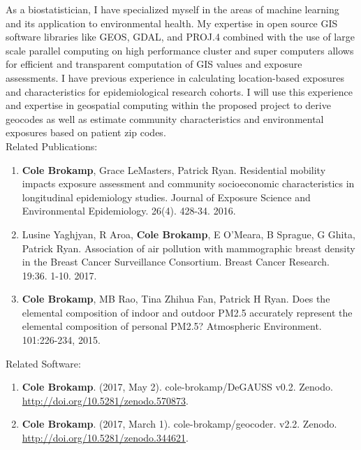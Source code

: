 \documentclass{nihbiosketch}
\begin{document}
\begin{statement}
As a biostatistician, I have specialized myself in the areas of machine learning and its application to environmental health. My expertise in open source GIS software libraries like GEOS, GDAL, and PROJ.4 combined with the use of large scale parallel computing on high performance cluster and super computers allows for efficient and transparent computation of GIS values and exposure assessments. I have previous experience in calculating location-based exposures and characteristics for epidemiological research cohorts.  I will use this experience and expertise in geospatial computing within the proposed project to derive geocodes as well as estimate community characteristics and environmental exposures based on patient zip codes.\\

\noindent Related Publications:

\begin{enumerate}
	
\item \textbf{Cole Brokamp}, Grace LeMasters, Patrick Ryan. Residential mobility impacts exposure assessment and community socioeconomic characteristics in longitudinal epidemiology studies. Journal of Exposure Science and Environmental Epidemiology. 26(4). 428-34. 2016.

\item Lusine Yaghjyan, R Aroa, \textbf{Cole Brokamp}, E O'Meara, B Sprague, G Ghita, Patrick Ryan. Association of air pollution with mammographic breast density in the Breast Cancer Surveillance Consortium. Breast Cancer Research. 19:36. 1-10. 2017.

\item \textbf{Cole Brokamp}, MB Rao, Tina Zhihua Fan, Patrick H Ryan. Does the elemental composition of indoor and outdoor PM2.5 accurately represent the elemental composition of personal PM2.5? Atmospheric Environment. 101:226-234, 2015.

\end{enumerate}

\noindent Related Software:

\begin{enumerate}

\item \textbf{Cole Brokamp}. (2017, May 2). cole-brokamp/DeGAUSS v0.2. Zenodo. \url{http://doi.org/10.5281/zenodo.570873}.

\item \textbf{Cole Brokamp}. (2017, March 1). cole-brokamp/geocoder. v2.2. Zenodo. \url{http://doi.org/10.5281/zenodo.344621}.

\end{enumerate}

\end{statement}
\end{document}
